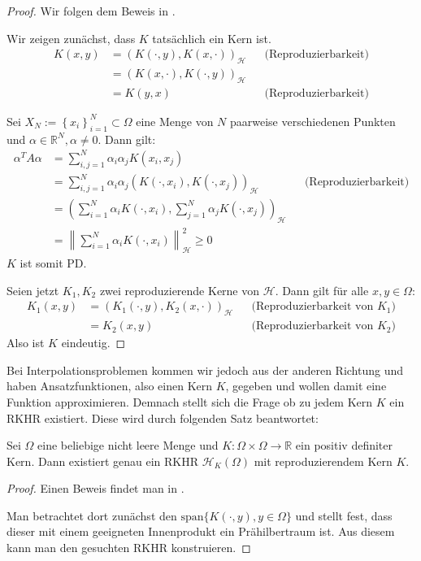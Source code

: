 \begin{proof}
Wir folgen dem Beweis in \textcite[Theorem 3.6]{Santin.2017}.

Wir zeigen zunächst, dass $K$ tatsächlich ein Kern ist.
\begin{align*}
K(x,y) &= \left( K(\cdot,y), K(x, \cdot)\right)_\mathcal{H} &&\text{(Reproduzierbarkeit)}\\
&= \left(K(x,\cdot), K(\cdot,y)\right)_\mathcal{H}\\
&= K(y,x) &&\text{(Reproduzierbarkeit)}
\end{align*}

Sei $X_N := \left\{ x_i \right\}_{i=1}^N \subset \Omega$ eine Menge von $N$ paarweise verschiedenen Punkten und $\alpha \in \mathbb{R}^N, \alpha \neq 0$. Dann gilt:
\begin{align*}
\alpha^T A \alpha &= \sum_{i,j=1}^N \alpha_i \alpha_j K(x_i, x_j)\\
&= \sum_{i,j=1}^N \alpha_i \alpha_j \left(K(\cdot, x_i), K(\cdot,x_j)\right)_\mathcal{H} &&\text{(Reproduzierbarkeit)}\\
&= \left(\sum_{i=1}^N \alpha_i K(\cdot,x_i), \sum_{j=1}^N \alpha_j K(\cdot, x_j)\right)_\mathcal{H}\\
&= \left\| \sum_{i=1}^N \alpha_i K(\cdot,x_i)\right\|_\mathcal{H}^2 \geq 0
\end{align*}
$K$ ist somit \ac{PD}.

Seien jetzt $K_1, K_2$ zwei reproduzierende Kerne von $\mathcal{H}$. Dann gilt für alle $x,y \in \Omega$:
\begin{align*}
K_1(x,y) &= (K_1(\cdot,y), K_2(x, \cdot))_\mathcal{H} &&\text{(Reproduzierbarkeit von }K_1\text{)}\\
&= K_2(x,y) &&\text{(Reproduzierbarkeit von }K_2\text{)}
\end{align*}
Also ist $K$ eindeutig.
\end{proof}

Bei Interpolationsproblemen kommen wir jedoch aus der anderen Richtung und haben Ansatzfunktionen, also einen Kern $K$, gegeben und wollen damit eine Funktion approximieren. Demnach stellt sich die Frage ob zu jedem Kern $K$ ein \ac{RKHR} existiert. Diese wird durch folgenden Satz beantwortet:

\begin{theorem}
Sei $\Omega$ eine beliebige nicht leere Menge und $K:\Omega \times \Omega \rightarrow \mathbb{R}$ ein positiv definiter Kern. Dann existiert genau ein \ac{RKHR} $\mathcal{H}_K (\Omega)$ mit reproduzierendem Kern $K$.
\end{theorem}
\begin{proof}
Einen Beweis findet man in \textcite[Kap. 10.2]{Wendland.2005}. 

Man betrachtet dort zunächst den $\text{span} \{K(\cdot,y), y \in \Omega \}$ und stellt fest, dass dieser mit einem geeigneten Innenprodukt ein Prähilbertraum ist. Aus diesem kann man den gesuchten \ac{RKHR} konstruieren.
\end{proof}

